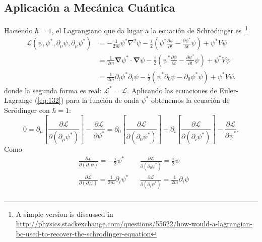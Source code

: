 \begin{subappendices}
  



\section{Aplicaci\'on a Mec\'anica Cu\'antica}
\label{sec:aplic-mecan-cuant}

\begin{frame}
Haciendo $\hbar=1$, el Lagrangiano que da lugar a la ecuaci\'on de Schr\"odinger es~\cite{0712.1608}\footnote{A simple version is discussed in 
\url{http://physics.stackexchange.com/questions/55622/how-would-a-lagrangian-be-used-to-recover-the-schrodinger-equation}}
\begin{align}
\label{eq:5tcc}
  \mathcal{L}(\psi,\psi^*,\partial_\mu\psi,\partial_\mu\psi^*)
  &=-\frac{1}{2m}\psi^*\nabla^2\psi-\frac{i}{2}
  \left(
\psi^*\frac{\partial\psi}{\partial t}-\frac{\partial\psi^*}{\partial t}\psi
  \right)+\psi^*V\psi\\
&=\frac{1}{2m}\boldsymbol{\nabla}\psi^*\cdot\boldsymbol{\nabla}\psi-\frac{i}{2}
  \left(
\psi^*\frac{\partial\psi}{\partial t}-\frac{\partial\psi^*}{\partial t}\psi
  \right)+\psi^*V\psi\\
&=\frac{1}{2m}\partial_i\psi^*\partial_i\psi-\frac{i}{2}
  \left(\psi^*\partial_0\psi-\partial_0\psi^*\psi\right)+\psi^*V\psi.\nonumber
\end{align}
donde la segunda forma es real: $\mathcal{L}^*=\mathcal{L}$. Aplicando las ecuaciones de Euler-Lagrange (\ref{eq:132}) para
la funci\'on de onda $\psi^*$ obtenemos la ecuaci\'on de Scr\"odinger con $\hbar=1$:
\begin{equation}
  \label{eq:137}
    0=\partial_\mu\left[\frac{\partial\mathcal{L}}{\partial(\partial_\mu\psi^*)}\right]-\frac{\partial\mathcal{L}}{\partial\psi^*}=
  \partial_0\left[\frac{\partial\mathcal{L}}{\partial(\partial_0\psi^*)}\right]+  
\partial_i\left[\frac{\partial\mathcal{L}}{\partial(\partial_i\psi^*)}\right]-\frac{\partial\mathcal{L}}{\partial\psi^*}.
\end{equation}
Como
\begin{align}
  \label{eq:136}
  &\frac{\partial\mathcal{L}}{\partial(\partial_0\psi)}=-\frac{i}{2}\psi^*&&\frac{\partial\mathcal{L}}{\partial(\partial_0\psi^*)}=\frac{i}{2}\psi\nonumber\\
  &\frac{\partial\mathcal{L}}{\partial(\partial_i\psi)}=\frac{1}{2m}\partial_i\psi^*&&\frac{\partial\mathcal{L}}{\partial(\partial_i\psi^*)}=\frac{1}{2m}\partial_i\psi\\

\end{align}
\end{frame}
\end{subappendices}
